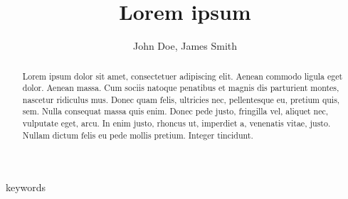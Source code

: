 \documentclass[journal]{INJOITrus}
\begin{document}





\title{Lorem ipsum}
\author{John Doe, James Smith}
\maketitleeng
\begin{abstract}
Lorem ipsum dolor sit amet, consectetuer adipiscing elit. Aenean commodo ligula eget dolor. Aenean massa. Cum sociis natoque penatibus et magnis dis parturient montes, nascetur ridiculus mus. Donec quam felis, ultricies nec, pellentesque eu, pretium quis, sem. Nulla consequat massa quis enim. Donec pede justo, fringilla vel, aliquet nec, vulputate eget, arcu. In enim justo, rhoncus ut, imperdiet a, venenatis vitae, justo. Nullam dictum felis eu pede mollis pretium. Integer tincidunt.
\end{abstract}
\begin{IEEEkeywords}
keywords
\end{IEEEkeywords}
\end{document}
